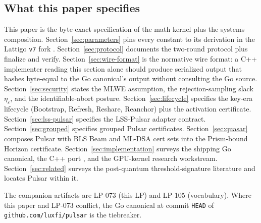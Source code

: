 \subsection{What this paper specifies}

This paper is the byte-exact specification of the math kernel plus the systems composition. Section~\ref{sec:parameters} pins every constant to its derivation in the Lattigo \texttt{v7} fork \cite{lattigov7}. Section~\ref{sec:protocol} documents the two-round protocol plus finalize and verify. Section~\ref{sec:wire-format} is the normative wire format: a C++ implementer reading this section alone should produce serialized output that hashes byte-equal to the Go canonical's output without consulting the Go source. Section~\ref{sec:security} states the MLWE assumption, the rejection-sampling slack $\eta_\varepsilon$, and the identifiable-abort posture. Section~\ref{sec:lifecycle} specifies the key-era lifecycle (Bootstrap, Refresh, Reshare, Reanchor) plus the activation certificate. Section~\ref{sec:lss-pulsar} specifies the LSS-Pulsar adapter contract. Section~\ref{sec:grouped} specifies grouped Pulsar certificates. Section~\ref{sec:quasar} composes Pulsar with BLS Beam and ML-DSA cert sets into the Prism-bound Horizon certificate. Section~\ref{sec:implementation} surveys the shipping Go canonical, the C++ port \cite{lp137}, and the GPU-kernel research workstream. Section~\ref{sec:related} surveys the post-quantum threshold-signature literature and locates Pulsar within it.

The companion artifacts are LP-073 \cite{lp073} (this LP) and LP-105 \cite{lp105} (vocabulary). Where this paper and LP-073 conflict, the Go canonical at commit \texttt{HEAD} of \texttt{github.com/luxfi/pulsar} is the tiebreaker.
